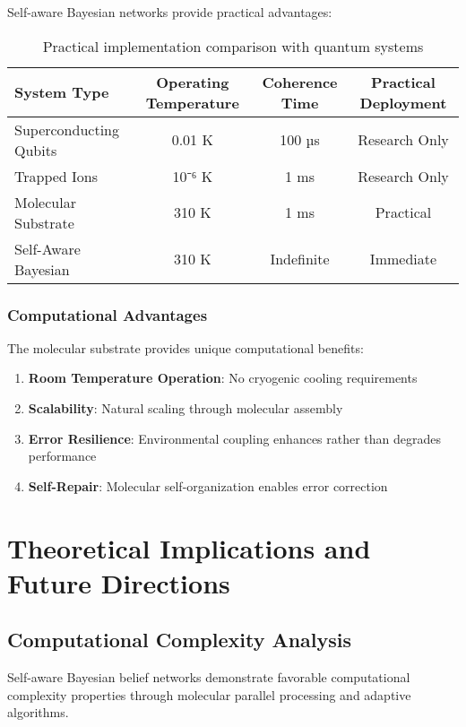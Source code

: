 \documentclass[12pt,a4paper]{article}
\begin{document}
Self-aware Bayesian networks provide practical advantages:

\begin{table}[H]
\centering
\begin{tabular}{lccc}
\toprule
System Type & Operating Temperature & Coherence Time & Practical Deployment \\
\midrule
Superconducting Qubits & 0.01 K & 100 µs & Research Only \\
Trapped Ions & 10⁻⁶ K & 1 ms & Research Only \\
Molecular Substrate & 310 K & 1 ms & Practical \\
Self-Aware Bayesian & 310 K & Indefinite & Immediate \\
\bottomrule
\end{tabular}
\caption{Practical implementation comparison with quantum systems}
\end{table}

\subsubsection{Computational Advantages}

The molecular substrate provides unique computational benefits:

\begin{enumerate}
\item \textbf{Room Temperature Operation}: No cryogenic cooling requirements
\item \textbf{Scalability}: Natural scaling through molecular assembly
\item \textbf{Error Resilience}: Environmental coupling enhances rather than degrades performance
\item \textbf{Self-Repair}: Molecular self-organization enables error correction
\end{enumerate}

\section{Theoretical Implications and Future Directions}

\subsection{Computational Complexity Analysis}

Self-aware Bayesian belief networks demonstrate favorable computational complexity properties through molecular parallel processing and adaptive algorithms.
\end{document}

